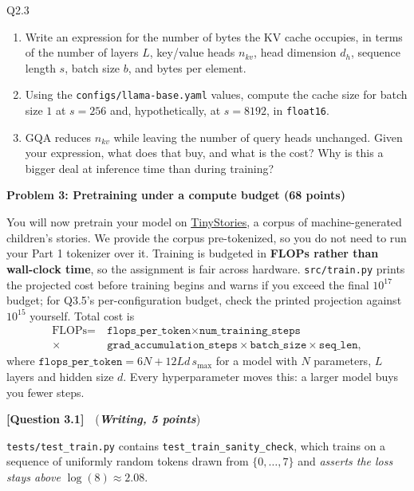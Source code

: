 \documentclass[11pt]{article}
\newcommand{\problem}[1]{%
  \vspace{1em}
  \noindent\colorbox{headerblue}{\parbox{\dimexpr\textwidth-2\fboxsep}{%
    \vspace{2pt}\textbf{\large #1}\vspace{2pt}}}
  \vspace{0.6em}
}
\newcommand{\question}[3]{%
  \vspace{0.9em}
  \noindent\textbf{[Question #1]}\ \ (\textit{\textbf{#2, #3 points}})\quad
}
\begin{document}
\begin{deliverables}{Q2.3}
\begin{enumerate}[label=\Alph*., leftmargin=1.6em]
  \item Write an expression for the number of bytes the KV cache occupies, in terms of the number
    of layers $L$, key/value heads $n_{kv}$, head dimension $d_h$, sequence length $s$, batch size
    $b$, and bytes per element.
  \item Using the \texttt{configs/llama-base.yaml} values, compute the cache size for batch
    size $1$ at $s = 256$ and, hypothetically, at $s = 8192$, in \texttt{float16}.
  \item GQA reduces $n_{kv}$ while leaving the number of query heads unchanged. Given your
    expression, what does that buy, and what is the cost? Why is this a bigger deal at inference
    time than during training?
\end{enumerate}
\end{deliverables}


\problem{Problem 3: Pretraining under a compute budget (68 points)}

\noindent You will now pretrain your model on \href{https://arxiv.org/abs/2305.07759}{TinyStories}, a corpus
of machine-generated children's stories. We provide the corpus pre-tokenized, so you do not need to
run your Part 1 tokenizer over it.
Training is budgeted in \textbf{FLOPs rather than wall-clock time}, so the assignment is fair
across hardware. \texttt{src/train.py} prints the projected cost before training begins and warns
if you exceed the final $10^{17}$ budget; for Q3.5's per-configuration budget, check the printed
projection against $10^{15}$ yourself. Total cost is
\begin{align*}
  \text{FLOPs} = \ &\texttt{flops\_per\_token} \times \texttt{num\_training\_steps} \\
  \times\ &\texttt{grad\_accumulation\_steps} \times \texttt{batch\_size} \times \texttt{seq\_len},
\end{align*}
where $\texttt{flops\_per\_token} = 6N + 12 L d\, s_{\max}$ for a model with $N$ parameters, $L$
layers and hidden size $d$. Every hyperparameter moves this: a larger model buys you fewer steps.

\question{3.1}{Writing}{5}
\texttt{tests/test\_train.py} contains \texttt{test\_train\_sanity\_check}, which trains on a
sequence of uniformly random tokens drawn from $\{0,\dots,7\}$ and \emph{asserts the loss stays
above} $\log(8) \approx 2.08$.
\end{document}
